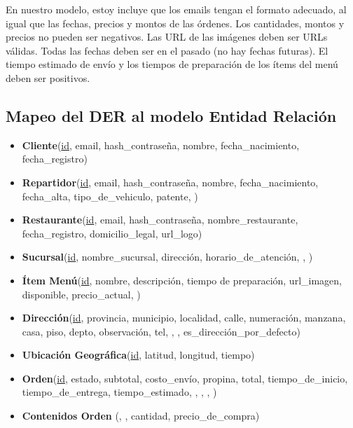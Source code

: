 En nuestro modelo, estoy incluye que los emails tengan el formato adecuado, al igual que las fechas, precios y montos de las órdenes. Los cantidades, montos y precios no pueden ser negativos. Las URL de las imágenes deben ser URLs válidas. Todas las fechas deben ser en el pasado (no hay fechas futuras). El tiempo estimado de envío y los tiempos de preparación de los ítems del menú deben ser positivos.


\subsection{Mapeo del DER al modelo Entidad Relación}

\begin{itemize}
    \item \textbf{Cliente}(\underline{id}, email, hash\_contraseña, nombre, fecha\_nacimiento, fecha\_registro)
    
    \item \textbf{Repartidor}(\underline{id}, email, hash\_contraseña, nombre, fecha\_nacimiento, fecha\_alta, tipo\_de\_vehiculo, patente, )
    
    \item \textbf{Restaurante}(\underline{id}, email, hash\_contraseña, nombre\_restaurante, fecha\_registro, domicilio\_legal, url\_logo)
    
    \item \textbf{Sucursal}(\underline{id}, nombre\_sucursal, dirección, horario\_de\_atención, , )
    
    \item \textbf{Ítem Menú}(\underline{id}, nombre, descripción, tiempo de preparación, url\_imagen, disponible, precio\_actual, )
    
    \item \textbf{Dirección}(\underline{id}, provincia, municipio, localidad, calle, numeración, manzana, casa, piso, depto, observación, tel, , , es\_dirección\_por\_defecto)
    
    \item \textbf{Ubicación Geográfica}(\underline{id}, latitud, longitud, tiempo)
    
    \item \textbf{Orden}(\underline{id}, estado, subtotal, costo\_envío, propina, total, tiempo\_de\_inicio, tiempo\_de\_entrega, tiempo\_estimado, , , , )
    
    \item \textbf{Contenidos Orden} (, , cantidad, precio\_de\_compra)
\end{itemize}
